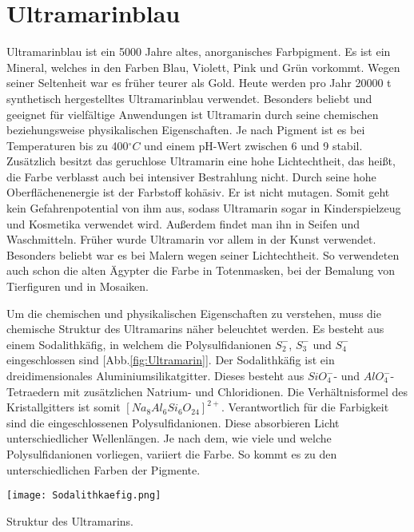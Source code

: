 \section{Ultramarinblau}

Ultramarinblau ist ein 5000 Jahre altes, anorganisches Farbpigment. Es ist ein Mineral, welches in den Farben Blau, Violett, Pink und Grün vorkommt. Wegen seiner Seltenheit war es früher teurer als Gold. Heute werden pro Jahr 20000 t synthetisch hergestelltes Ultramarinblau verwendet.
Besonders beliebt und geeignet für vielfältige Anwendungen ist Ultramarin durch seine chemischen beziehungsweise physikalischen Eigenschaften. Je nach Pigment ist es bei Temperaturen bis zu 400$^{\circ}C$ und einem pH-Wert zwischen 6 und 9 stabil. Zusätzlich besitzt das geruchlose Ultramarin eine hohe Lichtechtheit, das heißt, die Farbe verblasst auch bei intensiver Bestrahlung nicht. Durch  seine hohe Oberflächenenergie ist der Farbstoff kohäsiv. Er ist nicht mutagen. Somit geht kein Gefahrenpotential von ihm aus, sodass Ultramarin sogar in Kinderspielzeug und Kosmetika verwendet wird. Außerdem findet man ihn  in Seifen und Waschmitteln. 
Früher wurde Ultramarin vor allem in der Kunst verwendet. Besonders beliebt war es bei Malern wegen seiner Lichtechtheit. So verwendeten auch schon die alten Ägypter die Farbe in Totenmasken, bei der Bemalung von Tierfiguren und in Mosaiken.

Um die chemischen und physikalischen Eigenschaften zu verstehen, muss die chemische Struktur des Ultramarins näher beleuchtet werden.
Es besteht aus einem Sodalithkäfig, in welchem die Polysulfidanionen $S_2^{-}$, $S_3^{-}$ und $S_4^{-}$ eingeschlossen sind [Abb.\ref{fig:Ultramarin}].
Der Sodalithkäfig ist ein dreidimensionales Aluminiumsilikatgitter. Dieses besteht aus $SiO_{4}^{-}$- und $AlO_{4}^{-}$-Tetraedern mit zusätzlichen Natrium- und Chloridionen. Die Verhältnisformel des Kristallgitters ist somit $[Na_{8}Al_{6}Si_{6}O_{24}]^{2+}$.
Verantwortlich für die Farbigkeit sind die eingeschlossenen Polysulfidanionen. Diese absorbieren Licht unterschiedlicher Wellenlängen. Je nach dem, wie viele und welche Polysulfidanionen vorliegen, variiert die Farbe. So kommt es zu den unterschiedlichen Farben der Pigmente. 

\begin{dsafigure}
 \centering
 \texttt{[image: Sodalithkaefig.png]}
 \caption{Struktur des Ultramarins. \cite{sideplayer}}
 \label{fig:Ultramarin}
\end{dsafigure}

